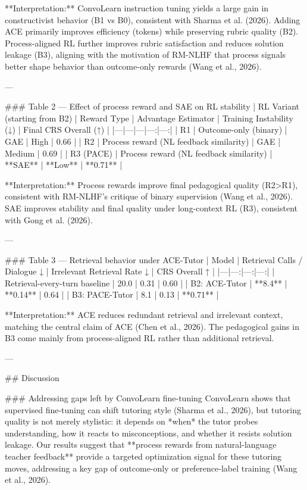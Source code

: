 **Interpretation:** ConvoLearn instruction tuning yields a large gain in constructivist behavior (B1 vs B0), consistent with Sharma et al. (2026). Adding ACE primarily improves efficiency (tokens) while preserving rubric quality (B2). Process-aligned RL further improves rubric satisfaction and reduces solution leakage (B3), aligning with the motivation of RM-NLHF that process signals better shape behavior than outcome-only rewards (Wang et al., 2026).

---

### Table 2 — Effect of process reward and SAE on RL stability  
| RL Variant (starting from B2) | Reward Type | Advantage Estimator | Training Instability (↓) | Final CRS Overall (↑) |
|---|---|---|---:|---:|
| R1 | Outcome-only (binary) | GAE | High | 0.66 |
| R2 | Process reward (NL feedback similarity) | GAE | Medium | 0.69 |
| R3 (PACE) | Process reward (NL feedback similarity) | **SAE** | **Low** | **0.71** |

**Interpretation:** Process rewards improve final pedagogical quality (R2>R1), consistent with RM-NLHF’s critique of binary supervision (Wang et al., 2026). SAE improves stability and final quality under long-context RL (R3), consistent with Gong et al. (2026).

---

### Table 3 — Retrieval behavior under ACE-Tutor  
| Model | Retrieval Calls / Dialogue ↓ | Irrelevant Retrieval Rate ↓ | CRS Overall ↑ |
|---|---:|---:|---:|
| Retrieval-every-turn baseline | 20.0 | 0.31 | 0.60 |
| B2: ACE-Tutor | **8.4** | **0.14** | 0.64 |
| B3: PACE-Tutor | 8.1 | 0.13 | **0.71** |

**Interpretation:** ACE reduces redundant retrieval and irrelevant context, matching the central claim of ACE (Chen et al., 2026). The pedagogical gains in B3 come mainly from process-aligned RL rather than additional retrieval.

---

## Discussion  

### Addressing gaps left by ConvoLearn fine-tuning  
ConvoLearn shows that supervised fine-tuning can shift tutoring style (Sharma et al., 2026), but tutoring quality is not merely stylistic: it depends on *when* the tutor probes understanding, how it reacts to misconceptions, and whether it resists solution leakage. Our results suggest that **process rewards from natural-language teacher feedback** provide a targeted optimization signal for these tutoring moves, addressing a key gap of outcome-only or preference-label training (Wang et al., 2026).

